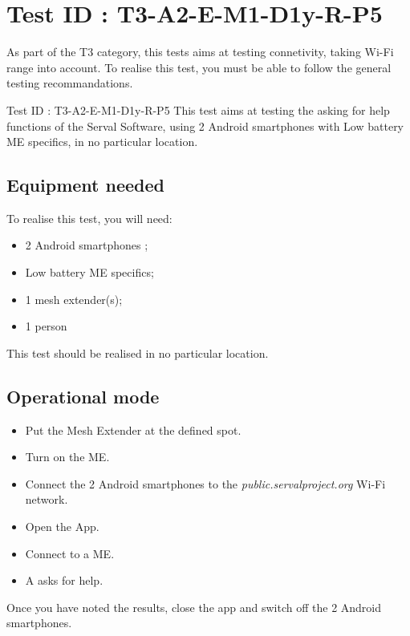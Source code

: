 \documentclass[oneside]{book}
\begin{document}
\section{Test ID : T3-A2-E-M1-D1y-R-P5}
\begin{itshape}
As part of the T3 category, this tests aims at testing connetivity, taking Wi-Fi range into account.
To realise this test, you must be able to follow the general testing recommandations.
\end{itshape}
\newline
Test ID : T3-A2-E-M1-D1y-R-P5
 This test aims at testing the asking for help functions of the Serval Software, using 2 Android smartphones with Low battery ME specifics, in no particular location.
\subsection{Equipment needed} To realise this test, you will need:
\begin{itemize}
\item 2 Android smartphones ;
\item Low battery ME specifics;
\item 1 mesh extender(s);
\item 1 person
\end{itemize}
This test should be realised in no particular location.
\subsection{Operational mode} \begin{itemize}
\item Put the Mesh Extender at the defined spot.
\item Turn on the ME.
\item Connect the 2 Android smartphones to the \emph{public.servalproject.org} Wi-Fi network.
\item Open the App.
\item Connect to a ME.
\item A asks for help.
\end{itemize}
Once you have noted the results, close the app and switch off the 2 Android smartphones.
\end{document}
